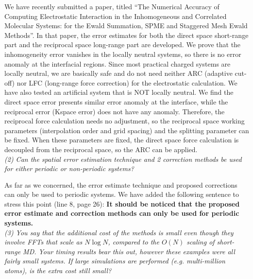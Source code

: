 \documentclass[a4paper]{article}
\begin{document}
We  have recently submitted a paper,
titled ``The Numerical Accuracy of Computing
Electrostatic Interaction in the Inhomogeneous and Correlated
Molecular Systems: for the Ewald Summation, SPME and Staggered Mesh
Ewald Methods''.
In that paper, the error estimates for both the
direct space short-range part and the reciprocal space long-range
part are developed.
We prove that the inhomogeneity error vanishes in the
locally neutral systems, so
there is no error anomaly at the interfacial regions. Since
most practical charged systems are locally neutral,
we are basically safe and
do not need neither ARC (adaptive cut-off)
nor LFC (long-range force correction)
for the electrostatic calculation. We 
have also tested an artificial system that is NOT locally neutral. We find
the direct space error presents similar error anomaly at the interface,
while the reciprocal error (Kspace error) does not
have any anomaly.
Therefore, the reciprocal force calculation
needs no adjustment, so the reciprocal space working parameters
(interpolation order and grid spacing) and the splitting
parameter can be fixed. When these parameters are fixed, the direct
space force calculation is decoupled from the reciprocal space,
so the ARC can be applied.
\\

\textit{
(2) Can the spatial error estimation technique and 2 correction
methods be used for either periodic or non-periodic systems?
}

As far as we concerned, the error estimate technique and proposed
corrections can only be used to periodic systems.
We have added the following sentence to stress this point
(line 8, page 26):
\textbf{It should be noticed that the proposed error estimate and correction
methods can only be used for periodic systems.}
\\


\textit{
  (3) You say that the additional cost of the methods is small even
though they involve FFTs that scale as $N\log N$, compared to the $O(N)$
scaling of short-range MD. Your timing results bear this out, however
these examples were all fairly small systems. If large simulations are
performed (e.g. multi-million atoms), is the extra cost still small?}
\end{document}
